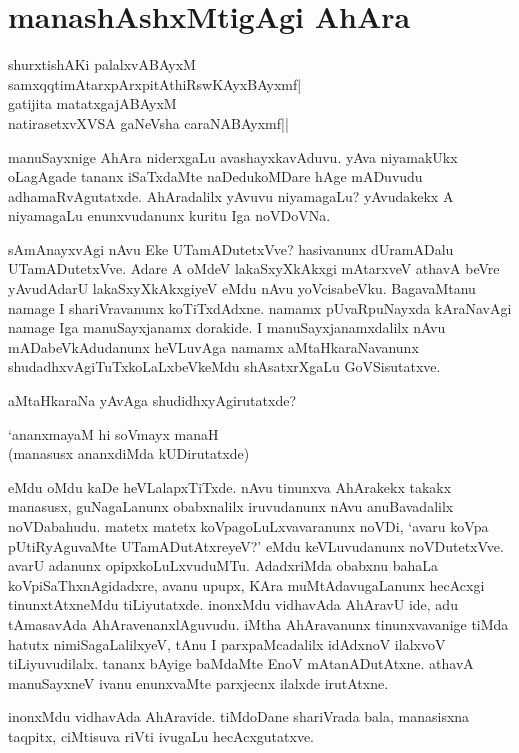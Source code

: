 \chapter{manashAshxMtigAgi AhAra}

\begin{shloka}
shurxtishAKi palalxvABAyxM\\
samxqqtimAtarxpArxpitAthiRswKAyxBAyxmf|\\
gatijita matatxgajABAyxM\\
natirasetxvXVSA gaNeVsha caraNABAyxmf||
\end{shloka}

manuSayxnige AhAra niderxgaLu avashayxkavAduvu. yAva niyamakUkx oLagAgade tananx iSaTxdaMte naDedukoMDare hAge mADuvudu adhamaRvAgutatxde. AhAradalilx yAvuvu niyamagaLu? yAvudakekx A niyamagaLu enunxvudanunx kuritu Iga noVDoVNa.

sAmAnayxvAgi nAvu Eke UTamADutetxVve? hasivanunx dUramADalu UTamADutetxVve. Adare A oMdeV lakaSxyXkAkxgi mAtarxveV athavA beVre yAvudAdarU lakaSxyXkAkxgiyeV eMdu nAvu yoVcisabeVku. BagavaMtanu namage I shariVravanunx koTiTxdAdxne. namamx pUvaRpuNayxda kAraNavAgi namage Iga manuSayxjanamx dorakide. I manuSayxjanamxdalilx nAvu mADabeVkAdudanunx heVLuvAga namamx aMtaHkaraNavanunx shudadhxvAgiTuTxkoLaLxbeVkeMdu shAsatxrXgaLu GoVSisutatxve.

aMtaHkaraNa yAvAga shudidhxyAgirutatxde?

\begin{shloka}
`ananxmayaM hi soVmayx manaH\\
(manasusx ananxdiMda kUDirutatxde)
\end{shloka}

\noindent eMdu oMdu kaDe heVLalapxTiTxde. nAvu tinunxva AhArakekx takakx manasusx, guNagaLanunx obabxnalilx iruvudanunx nAvu anuBavadalilx noVDabahudu. matetx matetx koVpagoLuLxvavaranunx noVDi, `avaru koVpa pUtiRyAguvaMte UTamADutAtxreyeV?' eMdu keVLuvudanunx noVDutetxVve. avarU adanunx opipxkoLuLxvuduMTu. AdadxriMda obabxnu bahaLa koVpiSaThxnAgidadxre, avanu upupx, KAra muMtAdavugaLanunx hecAcxgi tinunxtAtxneMdu tiLiyutatxde. inonxMdu vidhavAda AhAravU ide, adu tAmasavAda AhAravenanxlAguvudu. iMtha AhAravanunx tinunxvavanige tiMda hatutx nimiSagaLalilxyeV, tAnu I parxpaMcadalilx idAdxnoV ilalxvoV tiLiyuvudilalx. tananx bAyige baMdaMte EnoV mAtanADutAtxne. athavA manuSayxneV ivanu enunxvaMte parxjecnx ilalxde irutAtxne.

inonxMdu vidhavAda AhAravide. tiMdoDane shariVrada bala, manasisxna taqpitx, ciMtisuva riVti ivugaLu hecAcxgutatxve.

